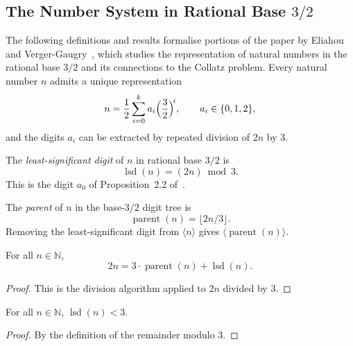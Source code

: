 
\subsection{The Number System in Rational Base \texorpdfstring{$3/2$}{3/2}}
\label{sec:base3div2}

The following definitions and results formalise portions of the paper by
Eliahou and Verger-Gaugry~\cite{eli25}, which studies the representation
of natural numbers in the rational base $3/2$ and its connections to the
Collatz problem.  Every natural number $n$ admits a unique representation
\[
  n = \frac{1}{2}\sum_{i=0}^{k} a_i \Bigl(\frac{3}{2}\Bigr)^{\!i},
  \qquad a_i \in \{0,1,2\},
\]
and the digits $a_i$ can be extracted by repeated division of $2n$ by $3$.


\begin{definition}\label{def:lsd}\leanok
The \emph{least-significant digit} of $n$ in rational base $3/2$ is
\[
  \operatorname{lsd}(n) = (2n) \bmod 3.
\]
This is the digit $a_0$ of Proposition~2.2 of~\cite{eli25}.
\end{definition}

\begin{definition}\label{def:parent}\leanok
The \emph{parent} of $n$ in the base-$3/2$ digit tree is
\[
  \operatorname{parent}(n) = \lfloor 2n / 3 \rfloor.
\]
Removing the least-significant digit from $\langle n \rangle$ gives
$\langle \operatorname{parent}(n) \rangle$.
\end{definition}

\begin{lemma}\label{lemma:two_mul_eq}\leanok
For all $n \in \mathbb{N}$,
\[
  2n = 3 \cdot \operatorname{parent}(n) + \operatorname{lsd}(n).
\]
\end{lemma}
\begin{proof}\leanok
This is the division algorithm applied to $2n$ divided by $3$.
\end{proof}

\begin{lemma}\label{lemma:lsd_lt_three}\leanok
For all $n \in \mathbb{N}$, $\operatorname{lsd}(n) < 3$.
\end{lemma}
\begin{proof}\leanok
By the definition of the remainder modulo $3$.
\end{proof}

